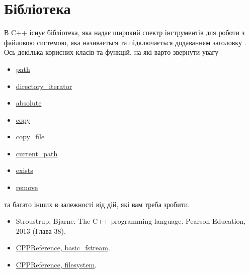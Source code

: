 \documentclass[12pt]{article}
\begin{document}
    \section{Бібліотека }
    В C++ існує бібліотека, яка надає широкий спектр інструментів для роботи з файловою системою, яка називається \href{https://en.cppreference.com/w/cpp/filesystem}{} та підключається додаванням заголовку . Ось декілька корисних класів та функцій, на які варто звернути увагу
    \begin{itemize}
        \item \href{https://en.cppreference.com/w/cpp/filesystem/path}{path}
        \item \href{https://en.cppreference.com/w/cpp/filesystem/directory_iterator}{directory\_iterator}
        \item \href{https://en.cppreference.com/w/cpp/filesystem/absolute}{absolute}
        \item \href{https://en.cppreference.com/w/cpp/filesystem/copy}{copy}
        \item \href{https://en.cppreference.com/w/cpp/filesystem/copy_file}{copy\_file}
        \item \href{https://en.cppreference.com/w/cpp/filesystem/current_path}{current\_path}
        \item \href{https://en.cppreference.com/w/cpp/filesystem/exists}{exists}
        \item \href{https://en.cppreference.com/w/cpp/filesystem/remove}{remove}
    \end{itemize}
    та багато інших в залежності від дій, які вам треба зробити.

	
	\begin{itemize}
		\item Stroustrup, Bjarne. The C++ programming language. Pearson Education, 2013 (Глава 38).
		\item \href{https://en.cppreference.com/w/cpp/io/basic_fstream}{CPPReference, basic\_fstream}.
		\item \href{https://en.cppreference.com/w/cpp/filesystem}{CPPReference, filesystem}.
	\end{itemize}
\end{document}
